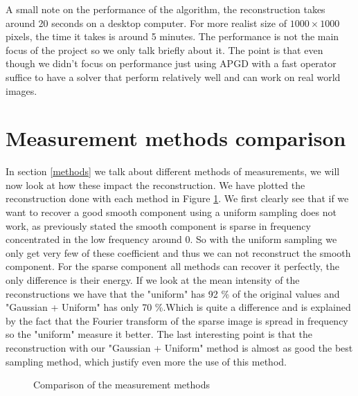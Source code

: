 \documentclass[a4paper,11pt,oneside]{report}
\theoremstyle{named}
\begin{document}
A small note on the performance of the algorithm, the reconstruction takes around 20 seconds on a desktop computer. For more realist size of $1000 \times 1000$ pixels, the time it takes is around 5 minutes. The performance is not the main focus of the project so we only talk briefly about it. The point is that even though we didn't focus on performance just using APGD with a fast operator suffice to have a solver that perform relatively well and can work on real world images.

\section{Measurement methods comparison}

In section \ref{methods} we talk about different methods of measurements, we will now look at how these impact the reconstruction. We have plotted the reconstruction done with each method in Figure \ref{fig:MeasurementMethodsReconstruction}. We first clearly see that if we want to recover a good smooth component using a uniform sampling does not work, as previously stated the smooth component is sparse in frequency concentrated in the low frequency around 0. So with the uniform sampling we only get very few of these coefficient and thus we can not reconstruct the smooth component. For the sparse component all methods can recover it perfectly, the only difference is their energy. If we look at the mean intensity of the reconstructions we have that the "uniform" has 92 \% of the original values and "Gaussian + Uniform" has only 70 \%.Which is quite a difference and is explained by the fact that the Fourier transform of the sparse image is spread in frequency so the "uniform" measure it better. The last interesting point is that the reconstruction with our "Gaussian + Uniform" method is almost as good the best sampling method, which justify even more the use of this method.

\begin{figure}
    \centering
    \caption{Comparison of the measurement methods}
    \label{fig:MeasurementMethodsReconstruction}
\end{figure}
\end{document}
